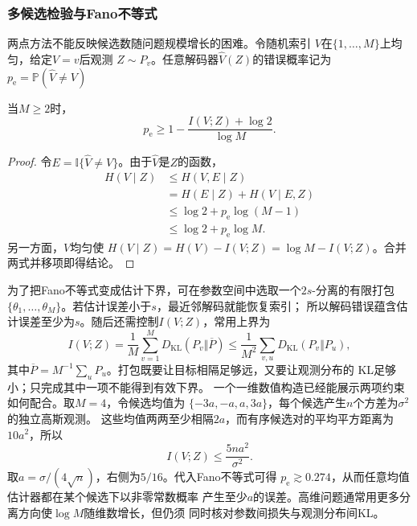 \subsubsection{多候选检验与Fano不等式}
两点方法不能反映候选数随问题规模增长的困难。令随机索引
\(V\)在\(\{1,\ldots,M\}\)上均匀，给定\(V=v\)后观测
\(Z\sim P_v\)。任意解码器\(\widehat V(Z)\)的错误概率记为
\(p_{\mathrm e}=\mathbb{P}(\widehat V\neq V)\)
\begin{theorem}[Fano不等式]
\label{thm:information-fano}
当\(M\geq2\)时，
\begin{equation}
  p_{\mathrm e}
  \geq
  1-\frac{I(V;Z)+\log2}{\log M}.
  \label{eq:information-fano}
\end{equation}
\end{theorem}
\begin{proof}
令\(E=\mathbb{I}\{\widehat V\neq V\}\)。由于\(\widehat V\)是\(Z\)的函数，
\[
\begin{aligned}
  H(V\mid Z)
  &\leq H(V,E\mid Z)\\
  &=H(E\mid Z)+H(V\mid E,Z)\\
  &\leq\log2+p_{\mathrm e}\log(M-1)\\
  &\leq\log2+p_{\mathrm e}\log M.
\end{aligned}
\]
另一方面，\(V\)均匀使
\(H(V\mid Z)=H(V)-I(V;Z)=\log M-I(V;Z)\)。合并两式并移项即得结论。
\end{proof}
为了把Fano不等式变成估计下界，可在参数空间中选取一个\(2s\)-分离的有限打包
\(\{\theta_1,\ldots,\theta_M\}\)。若估计误差小于\(s\)，最近邻解码就能恢复索引；
所以解码错误蕴含估计误差至少为\(s\)。随后还需控制\(I(V;Z)\)，常用上界为
\[
  I(V;Z)
  =
  \frac1M\sum_{v=1}^{M}
  D_{\mathrm{KL}}(P_v\Vert\overline P)
  \leq
  \frac1{M^2}\sum_{v,u}
  D_{\mathrm{KL}}(P_v\Vert P_u),
\]
其中\(\overline P=M^{-1}\sum_uP_u\)。打包既要让目标相隔足够远，又要让观测分布的
KL足够小；只完成其中一项不能得到有效下界。
一个一维数值构造已经能展示两项约束如何配合。取\(M=4\)，令候选均值为
\(\{-3a,-a,a,3a\}\)，每个候选产生\(n\)个方差为\(\sigma^2\)的独立高斯观测。
这些均值两两至少相隔\(2a\)，而有序候选对的平均平方距离为\(10a^2\)，所以
\[
  I(V;Z)
  \leq
  \frac{5na^2}{\sigma^2}.
\]
取\(a=\sigma/(4\sqrt n)\)，右侧为\(5/16\)。代入Fano不等式可得
\(p_{\mathrm e}\gtrsim0.274\)，从而任意均值估计器都在某个候选下以非零常数概率
产生至少\(a\)的误差。高维问题通常用更多分离方向使\(\log M\)随维数增长，但仍须
同时核对参数间损失与观测分布间KL。
